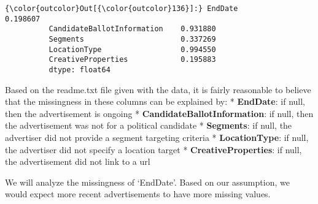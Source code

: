 \documentclass[11pt]{article}
\begin{document}
\begin{Verbatim}[commandchars=\\\{\}]
{\color{outcolor}Out[{\color{outcolor}136}]:} EndDate                       0.198607
          CandidateBallotInformation    0.931880
          Segments                      0.337269
          LocationType                  0.994550
          CreativeProperties            0.195883
          dtype: float64
\end{Verbatim}
            
    Based on the readme.txt file given with the data, it is fairly
reasonable to believe that the missingness in these columns can be
explained by: * \textbf{EndDate}: if null, then the advertisement is
ongoing * \textbf{CandidateBallotInformation}: if null, then the
advertisement was not for a political candidate * \textbf{Segments}: if
null, the advertiser did not provide a segment targeting criteria *
\textbf{LocationType}: if null, the advertiser did not specify a
location target * \textbf{CreativeProperties}: if null, the
advertisement did not link to a url

We will analyze the missingness of `EndDate'. Based on our assumption,
we would expect more recent advertisements to have more missing values.
\end{document}

